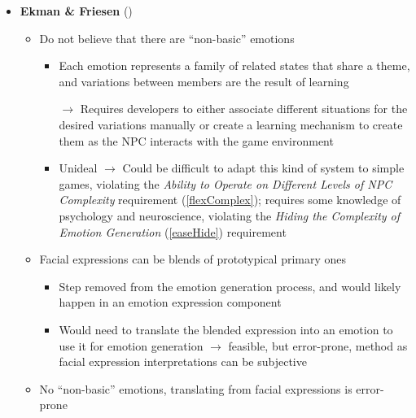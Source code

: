 \begin{itemize}
    \item \textbf{Ekman \& Friesen} (\weak)
    \begin{itemize}
        \item Do not believe that there are ``non-basic''
        emotions~\citep[p.~55, 57]{ekman1999basic}
        \begin{itemize}
            \item Each emotion represents a family of related states that share
            a theme, and variations between members are the result of learning

            \item [$\rightarrow$] Requires developers to either associate
            different situations for the desired variations manually or create
            a learning mechanism to create them as the NPC interacts with the
            game environment

            \item Unideal $\rightarrow$ Could be difficult to adapt this kind
            of system to simple games, violating the \textit{Ability to Operate
                on Different Levels of NPC Complexity} requirement
            (\ref{flexComplex}); requires some knowledge of psychology and
            neuroscience, violating the \textit{Hiding the Complexity of
                Emotion Generation} (\ref{easeHide}) requirement
        \end{itemize}

        \item Facial expressions can be blends of prototypical primary
        ones~\citep[p.~69]{ekman2007emotions}
        \begin{itemize}
            \item Step removed from the emotion generation process, and would
            likely happen in an emotion expression component

            \item Would need to translate the blended expression into an
            emotion to use it for emotion generation $\rightarrow$ feasible,
            but error-prone, method as facial expression interpretations can be
            subjective
        \end{itemize}

        \item No ``non-basic'' emotions, translating from facial expressions is
        error-prone
    \end{itemize}


\end{itemize}

